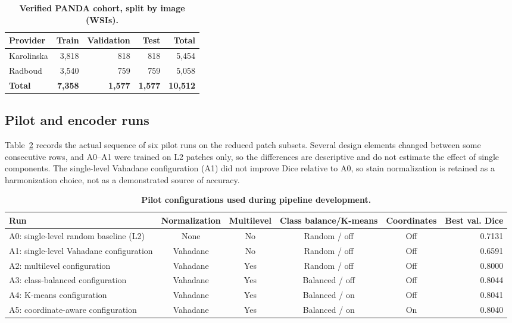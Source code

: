 \documentclass[10pt,letterpaper]{article}
\begin{document}
\begin{table}[H]\begin{adjustwidth}{-2.25in}{0in}\centering
\caption{\textbf{Verified PANDA cohort, split by image (WSIs).}}
\begin{tabular}{lrrrr}\toprule Provider & Train & Validation & Test & Total\\\midrule
Karolinska & 3,818 & 818 & 818 & 5,454\\
Radboud & 3,540 & 759 & 759 & 5,058\\
\textbf{Total} & \textbf{7,358} & \textbf{1,577} & \textbf{1,577} & \textbf{10,512}\\\bottomrule
\end{tabular}\label{tab:cohort}\end{adjustwidth}\end{table}

\subsection*{Pilot and encoder runs}
Table~\ref{tab:pilot} records the actual sequence of six pilot runs on the reduced patch subsets. Several design elements changed between some consecutive rows, and A0--A1 were trained on L2 patches only, so the differences are descriptive and do not estimate the effect of single components. The single-level Vahadane configuration (A1) did not improve Dice relative to A0, so stain normalization is retained as a harmonization choice, not as a demonstrated source of accuracy.

\begin{table}[H]\begin{adjustwidth}{-2.25in}{0in}\centering
\caption{\textbf{Pilot configurations used during pipeline development.}}
\begin{tabular}{p{4.8cm}ccccr}\toprule
Run & Normalization & Multilevel & Class balance/K-means & Coordinates & Best val. Dice\\\midrule
A0: single-level random baseline (L2) & None & No & Random / off & Off & 0.7131\\
A1: single-level Vahadane configuration & Vahadane & No & Random / off & Off & 0.6591\\
A2: multilevel configuration & Vahadane & Yes & Random / off & Off & 0.8000\\
A3: class-balanced configuration & Vahadane & Yes & Balanced / off & Off & 0.8044\\
A4: K-means configuration & Vahadane & Yes & Balanced / on & Off & 0.8041\\
A5: coordinate-aware configuration & Vahadane & Yes & Balanced / on & On & 0.8040\\\bottomrule
\end{tabular}\label{tab:pilot}\end{adjustwidth}\end{table}
\end{document}

